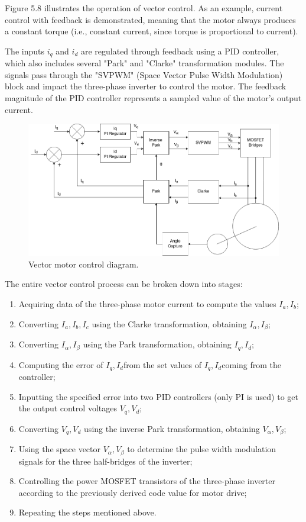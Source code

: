 Figure 5.8 illustrates the operation of vector control. As an example, current control with feedback is demonstrated, meaning that the motor always produces a constant torque (i.e., constant current, since torque is proportional to current).

The inputs $i_q$ and $i_d$ are regulated through feedback using a PID controller, which also includes several "Park" and "Clarke" transformation modules. The signals pass through the "SVPWM"  (Space Vector Pulse Width Modulation) block and impact the three-phase inverter to control the motor. The feedback magnitude of the PID controller represents a sampled value of the motor's output current.

\begin{figure}[H]
	\centering
	\includegraphics[width=\textwidth]{Src/images/FOC maindrawio.png}
	\caption{Vector motor control diagram.}
	\label{ACDFOCALG}
\end{figure}


The entire vector control process can be broken down into stages:
\begin{enumerate}
\item Acquiring data of the three-phase motor current to compute the values $I_a,I_b$;
\item Converting $I_a,I_b,I_c$ using the Clarke transformation, obtaining $I_\alpha,I_\beta$;
\item Converting $I_\alpha,I_\beta$ using the Park transformation, obtaining $I_q,I_d$;
\item Computing the error of $I_q,I_d$from the set values of $I_q,I_d$coming from the controller;
\item Inputting the specified error into two PID controllers (only PI is used) to get the output control voltages $V_q,V_d$;
\item Converting $V_q,V_d$ using the inverse Park transformation, obtaining $V_\alpha,V_\beta$;
\item Using the space vector $V_\alpha,V_\beta$ to determine the pulse width modulation signals for the three half-bridges of the inverter;
\item Controlling the power MOSFET transistors of the three-phase inverter according to the previously derived code value for motor drive;
\item Repeating the steps mentioned above.
\end{enumerate}

